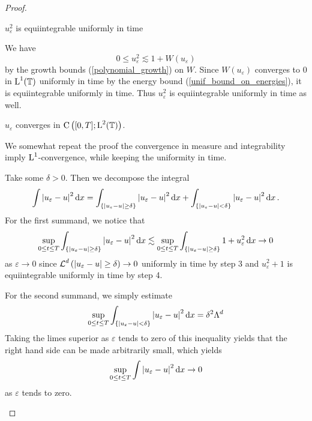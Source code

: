 \begin{proof}
\begin{description}[wide=0pt]
		\item[Step 4:] $ u_{ \varepsilon }^{ 2 } $ is equiintegrable uniformly in time
		
		We have 
		\begin{equation*}
			0 \leq u_{ \varepsilon }^{ 2 } \lesssim 1 + W ( u_{ \varepsilon } )
		\end{equation*}
		by the growth bounds (\ref{polynomial_growth}) on $ W $. Since $ W ( u_{ \varepsilon } ) $ converges to 0 in $ \operatorname{L}^{ 1 } ( \operatorname{\mathbb{T}} ) $ uniformly in time by the energy bound (\ref{unif_bound_on_energies}), it is equiintegrable uniformly in time. Thus $ u_{ \varepsilon }^{ 2 } $ is equiintegrable uniformly in time as well.
		
		\item[Step 5:] $ u_{ \varepsilon } $ converges in $ \operatorname{C} \left( [ 0 , T ] ; \operatorname{L}^{ 2 } ( \operatorname{\mathbb{T}} ) \right) $.
		
		We somewhat repeat the proof the convergence in measure and integrability imply $ \operatorname{L}^{ 1 } $-convergence, while keeping the uniformity in time.
		
		Take some $ \delta > 0 $. Then we decompose the integral
		\begin{equation*}
			\int \abs{ u_{ \varepsilon } - u }^{ 2 } \dd{ x }
			=
			\int_{ \{ \abs{ u_{ \varepsilon } - u } \geq \delta \} }
			\abs{ u_{\varepsilon } - u }^{ 2 }
			\dd{ x }
			+
			\int_{ \{ \abs{ u_{ \varepsilon } - u } < \delta \} }
			\abs{ u_{ \varepsilon } - u }^{ 2 }
			\dd{ x }.
		\end{equation*}
		For the first summand, we notice that
		\begin{equation*}
			\sup_{ 0 \leq t \leq T }
			\int_{ \{ \abs{ u_{ \varepsilon } - u } \geq \delta \} }
			\abs{ u_{\varepsilon } - u }^{ 2 }
			\dd{ x }
			\lesssim
			\sup_{ 0 \leq t \leq T }
			\int_{ \{ \abs{ u_{ \varepsilon } - u } \geq \delta \} }
			1 + u_{\varepsilon }^{ 2 }
			\dd{ x }
			\to 0
		\end{equation*}
		as $ \varepsilon \to 0 $ since $ \operatorname{\mathcal{L}}^{ d }\left( \abs{ u_{\varepsilon } - u } \geq \delta \right) \to 0 $ uniformly in time by step 3 and $ u_{\varepsilon }^{ 2 } + 1 $ is equiintegrable uniformly in time by step 4.
		
		For the second summand, we simply estimate
		\begin{equation*}
			\sup_{ 0 \leq t \leq T }
			\int_{ \{ \abs{ u_{ \varepsilon } - u } < \delta \} }
			\abs{ u_{ \varepsilon } - u }^{ 2 }
			\dd{ x }
			=
			\delta^{ 2 } \Lambda^{ d }
		\end{equation*}
		Taking the limes superior as $ \varepsilon $ tends to zero of this inequality yields that the right hand side can be made arbitrarily small, which yields
		\begin{equation*}
			\sup_{ 0 \leq t \leq T }
			\int
			\abs{ u_{ \varepsilon } - u }^{ 2 }
			\dd{ x }
			\to 
			0
		\end{equation*}
		as $ \varepsilon $ tends to zero.
	\end{description}
\end{proof}

